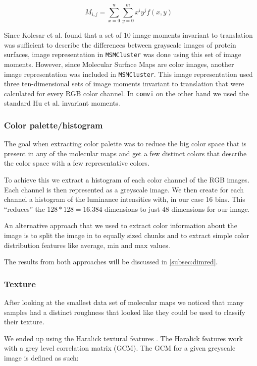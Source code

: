 \documentclass[journal]{vgtc}       %
\newcommand{\todo}[1]{\textcolor{red}{\textbf{TODO:} #1}}
\begin{document}
\[M_{i,j} = \sum^n_{x=0}\sum^m_{y=0} x^i y^j f(x,y) \]


Since Kolesar et al. found that a set of 10 image moments invariant to translation was sufficient to describe the differences between grayscale images of protein surfaces, image representation in \verb|MSMCluster| was done using this set of image moments. However, since Molecular Surface Maps are color images, another image representation was included in \verb|MSMCluster|. This image representation used three ten-dimensional sets of image moments invariant to translation that were calculated for every RGB color channel. In \verb|comvi| on the other hand we used the standard  Hu et al. invariant moments. 


\subsubsection{Color palette/histogram }

The goal when extracting color palette was to reduce the big color space that is present in any of the molecular maps and get a few distinct  colors that describe the color space with a few representative colors.

To achieve this we extract a histogram of each color channel of the RGB images. Each channel is then represented as a greyscale image. We then create for each channel a histogram of the luminance intensities with, in our case 16 bins. This ``reduces'' the \(128*128 = 16.384\) dimensions to just \(48\) dimensions for our image.

An alternative approach that we used to extract color information about the image is to split the image in to equally sized chunks and to extract simple color distribution features like average, min and max values.

The results from both approaches will be discussed in \ref{subsec:dimred}.

\subsubsection{Texture}
After looking at the smallest data set of molecular maps we noticed that many samples had a distinct roughness that looked like they could be used to classify their texture.

We ended up using the Haralick textural features \cite{haralick}  . The Haralick features work with a grey level correlation matrix (GCM). The GCM for a given greyscale image is defined as such:
\end{document}
